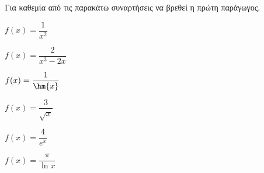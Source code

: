 Για καθεμία από τις παρακάτω συναρτήσεις να βρεθεί η πρώτη παράγωγος.
\begin{multicols}{2}
\begin{alist}
\item $ f(x)=\dfrac{1}{x^2} $
\item $ f(x)=\dfrac{2}{x^3-2x} $
\item $ f(x)=\dfrac{1}{\hm{x}} $
\item $ f(x)=\dfrac{3}{\sqrt{x}} $
\item $ f(x)=\dfrac{4}{e^x} $
\item $ f(x)=\dfrac{\pi}{\ln{x}} $
\end{alist}
\end{multicols}
